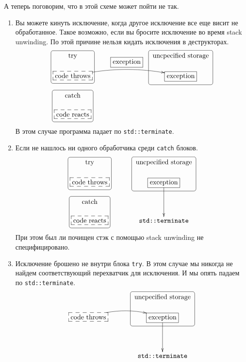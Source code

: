А теперь поговорим, что в этой схеме может пойти не так.
\begin{enumerate}
\item Вы можете кинуть исключение, когда другое исключение все еще висит не обработанное.
Такое возможно, если вы бросите исключение во время stack unwinding.
По этой причине нельзя кидать исключения в деструкторах.
\[
\xymatrix@R=15pt@C=40pt{
  {\text{try}}
 	{
	\save
   [].[d]*+[F-:<3pt>]\frm{}
   \restore
	}
  &{}&{\text{uncpecified storage}}
   	{
	\save
   [].[d]*+[F-:<3pt>]\frm{}
   \restore
	}
  \\
  {\text{code throws}}\ar@/^10pt/[rr]^{\boxed{\text{exception}}}
       	{
	\save
   [].[]*[F--]\frm{}
   \restore
	}
  &{}&{\text{exception}}%
   	{
	\save
   [].[]*[F-]\frm{}
   \restore
	}
  \\
  {\text{catch}}
   	{
	\save
   [].[d]*+[F-:<3pt>]\frm{}
   \restore
	}
  &{}&{}\\
  {\text{code reacts}}
     	{
	\save
   [].[]*[F--]\frm{}
   \restore
	}
  &{}&{}\\
}
\]
В этом случае программа падает по \verb"std::terminate".

\item Если не нашлось ни одного обработчика среди \verb"catch" блоков.
\[
\xymatrix@R=15pt@C=15pt{
  {\text{try}}
 	{
	\save
   [].[d]*+[F-:<3pt>]\frm{}
   \restore
	}
  &{}&{\text{uncpecified storage}}
   	{
	\save
   [].[d]*+[F-:<3pt>]\frm{}
   \restore
	}
  \\
  {\text{code throws}}
       	{
	\save
   [].[]*[F--]\frm{}
   \restore
	}
  &{}&{\text{exception}}\ar[dd]
   	{
	\save
   [].[]*[F-]\frm{}
   \restore
	}
  \\
  {\text{catch}}
   	{
	\save
   [].[d]*+[F-:<3pt>]\frm{}
   \restore
	}
  &{}&{}\\
  {\text{code reacts}}
     	{
	\save
   [].[]*[F--]\frm{}
   \restore
	}
  &{}&{\texttt{std::terminate}}\\
}
\]
При этом был ли почищен стэк с помощью stack unwinding не специфицировано.

\item Исключение брошено не внутри блока \verb"try".
В этом случае мы никогда не найдем соответствующий перехватчик для исключения.
И мы опять падаем по \verb"std::terminate".
\[
\xymatrix@R=15pt@C=15pt{
  {\phantom{\text{try}}}
  &{}&{\text{uncpecified storage}}
   	{
	\save
   [].[d]*+[F-:<3pt>]\frm{}
   \restore
	}
  \\
  {\text{code throws}}\ar@/^10pt/[rr]
       	{
	\save
   [].[]*[F--]\frm{}
   \restore
	}
  &{}&{\text{exception}}\ar[dd]
   	{
	\save
   [].[]*[F-]\frm{}
   \restore
	}
  \\
  {\phantom{\text{catch}}}
  &{}&{}\\
  {\phantom{\text{code reacts}}}
  &{}&{\texttt{std::terminate}}\\
}
\]
\end{enumerate}

